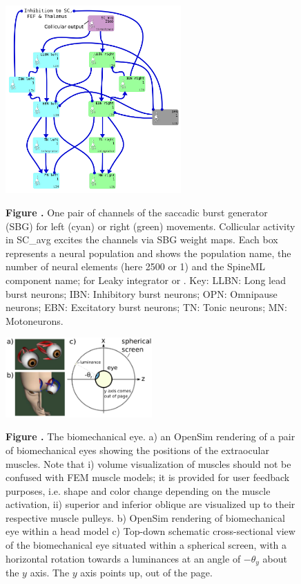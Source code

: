 \documentclass{frontiersSCNS}
\begin{document}
\begin{figure}[t]
\begin{center}
\includegraphics[width=0.6\textwidth]{./figures/Brain_Stem_1channel.png}
\end{center}
\textbf{\label{fig:sbg} Figure .}
{ One pair of channels of the saccadic burst generator (SBG) for left
(cyan) or right (green) movements. Collicular activity in SC\_avg
excites the channels via SBG weight maps. Each box represents a neural
population and shows the population name, the number of neural
elements (here 2500 or 1) and the SpineML component name;  for
Leaky integrator or . Key: LLBN: Long lead burst
neurons; IBN: Inhibitory burst neurons; OPN: Omnipause neurons; EBN:
Excitatory burst neurons; TN: Tonic neurons; MN: Motoneurons.}
\end{figure}

\begin{figure}[t]
\begin{center}
\includegraphics[width=0.5\textwidth]{./figures/eye_screen_plus.png}
\end{center}
\textbf{\label{fig:bioeye} Figure .}
{ The biomechanical eye. a) an OpenSim rendering of a pair of
biomechanical eyes showing the positions of the extraocular
muscles. Note that i) volume visualization of muscles should not be
confused with FEM muscle models; it is provided for user feedback
purposes, i.e. shape and color change depending on the muscle
activation, ii) superior and inferior oblique are visualized up to
their respective muscle pulleys. b) OpenSim rendering of biomechanical
eye within a head model c) Top-down schematic cross-sectional view of
the biomechanical eye situated within a spherical screen, with a
horizontal rotation towards a luminances at an angle of $-\theta_{y}$
about the $y$ axis. The $y$ axis points up, out of the page.}
\end{figure}
\end{document}
